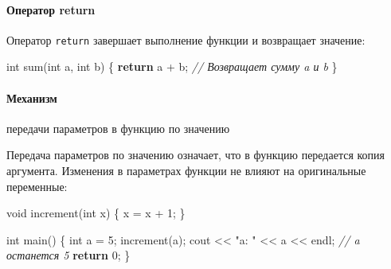 \documentclass[
]{article}
\newenvironment{Shaded}{}{}
\newcommand{\CommentTok}[1]{\textcolor[rgb]{0.38,0.63,0.69}{\textit{#1}}}
\newcommand{\ControlFlowTok}[1]{\textcolor[rgb]{0.00,0.44,0.13}{\textbf{#1}}}
\newcommand{\DataTypeTok}[1]{\textcolor[rgb]{0.56,0.13,0.00}{#1}}
\newcommand{\DecValTok}[1]{\textcolor[rgb]{0.25,0.63,0.44}{#1}}
\newcommand{\NormalTok}[1]{#1}
\newcommand{\OperatorTok}[1]{\textcolor[rgb]{0.40,0.40,0.40}{#1}}
\newcommand{\StringTok}[1]{\textcolor[rgb]{0.25,0.44,0.63}{#1}}
\begin{document}
\paragraph{Оператор
return}\label{ux43eux43fux435ux440ux430ux442ux43eux440-return}

Оператор \texttt{return} завершает выполнение функции и возвращает
значение:

\begin{Shaded}
\begin{Highlighting}[]
\DataTypeTok{int}\NormalTok{ sum}\OperatorTok{(}\DataTypeTok{int}\NormalTok{ a}\OperatorTok{,} \DataTypeTok{int}\NormalTok{ b}\OperatorTok{)} \OperatorTok{\{}
    \ControlFlowTok{return}\NormalTok{ a }\OperatorTok{+}\NormalTok{ b}\OperatorTok{;} \CommentTok{// Возвращает сумму a и b}
\OperatorTok{\}}
\end{Highlighting}
\end{Shaded}

\paragraph{Механизм}\label{ux43cux435ux445ux430ux43dux438ux437ux43c}

передачи параметров в функцию по значению

Передача параметров по значению означает, что в функцию передается копия
аргумента. Изменения в параметрах функции не влияют на оригинальные
переменные:

\begin{Shaded}
\begin{Highlighting}[]
\DataTypeTok{void}\NormalTok{ increment}\OperatorTok{(}\DataTypeTok{int}\NormalTok{ x}\OperatorTok{)} \OperatorTok{\{}
\NormalTok{    x }\OperatorTok{=}\NormalTok{ x }\OperatorTok{+} \DecValTok{1}\OperatorTok{;}
\OperatorTok{\}}

\DataTypeTok{int}\NormalTok{ main}\OperatorTok{()} \OperatorTok{\{}
    \DataTypeTok{int}\NormalTok{ a }\OperatorTok{=} \DecValTok{5}\OperatorTok{;}
\NormalTok{    increment}\OperatorTok{(}\NormalTok{a}\OperatorTok{);}
\NormalTok{    cout }\OperatorTok{\textless{}\textless{}} \StringTok{"a: "} \OperatorTok{\textless{}\textless{}}\NormalTok{ a }\OperatorTok{\textless{}\textless{}}\NormalTok{ endl}\OperatorTok{;} \CommentTok{// a останется 5}
    \ControlFlowTok{return} \DecValTok{0}\OperatorTok{;}
\OperatorTok{\}}
\end{Highlighting}
\end{Shaded}
\end{document}
